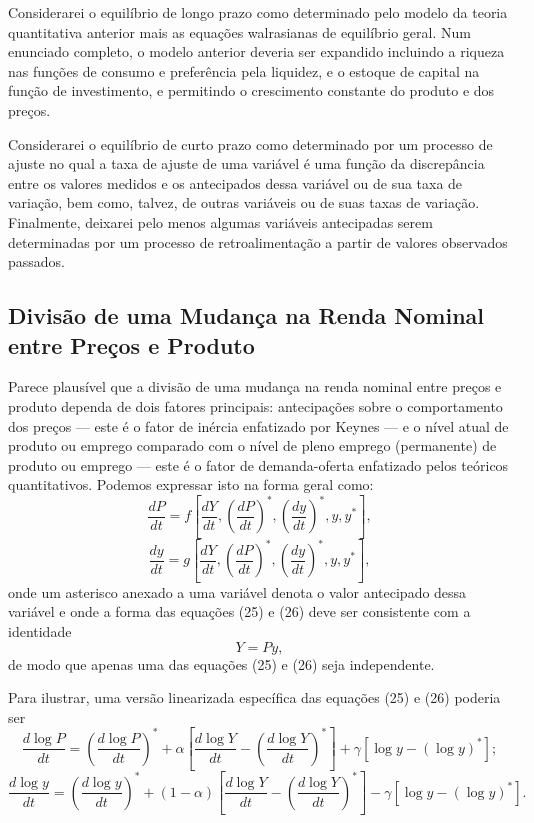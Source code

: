 \documentclass[12pt]{article}
\begin{document}
Considerarei o equilíbrio de longo prazo como determinado pelo modelo da teoria quantitativa anterior mais as equações walrasianas de equilíbrio geral. Num enunciado completo, o modelo anterior deveria ser expandido incluindo a riqueza nas funções de consumo e preferência pela liquidez, e o estoque de capital na função de investimento, e permitindo o crescimento constante do produto e dos preços.

Considerarei o equilíbrio de curto prazo como determinado por um processo de ajuste no qual a taxa de ajuste de uma variável é uma função da discrepância entre os valores medidos e os antecipados dessa variável ou de sua taxa de variação, bem como, talvez, de outras variáveis ou de suas taxas de variação. Finalmente, deixarei pelo menos algumas variáveis antecipadas serem determinadas por um processo de retroalimentação a partir de valores observados passados.

\subsection{Divisão de uma Mudança na Renda Nominal entre Preços e Produto}

Parece plausível que a divisão de uma mudança na renda nominal entre preços e produto dependa de dois fatores principais: antecipações sobre o comportamento dos preços — este é o fator de inércia enfatizado por Keynes — e o nível atual de produto ou emprego comparado com o nível de pleno emprego (permanente) de produto ou emprego — este é o fator de demanda-oferta enfatizado pelos teóricos quantitativos. Podemos expressar isto na forma geral como:
\begin{equation}
\frac{dP}{dt} = f\left[ \frac{dY}{dt}, \left(\frac{dP}{dt}\right)^*, \left(\frac{dy}{dt}\right)^*, y, y^* \right],
\end{equation}
\begin{equation}
\frac{dy}{dt} = g\left[ \frac{dY}{dt}, \left(\frac{dP}{dt}\right)^*, \left(\frac{dy}{dt}\right)^*, y, y^* \right],
\end{equation}
onde um asterisco anexado a uma variável denota o valor antecipado dessa variável e onde a forma das equações (25) e (26) deve ser consistente com a identidade
\begin{equation}
Y = Py,
\end{equation}
de modo que apenas uma das equações (25) e (26) seja independente.

Para ilustrar, uma versão linearizada específica das equações (25) e (26) poderia ser
\begin{equation}
\frac{d \log P}{dt} = \left( \frac{d \log P}{dt} \right)^* + \alpha \left[ \frac{d \log Y}{dt} - \left( \frac{d \log Y}{dt} \right)^* \right] + \gamma [\log y - (\log y)^*];
\end{equation}
\begin{equation}
\frac{d \log y}{dt} = \left( \frac{d \log y}{dt} \right)^* + (1 - \alpha) \left[ \frac{d \log Y}{dt} - \left( \frac{d \log Y}{dt} \right)^* \right] - \gamma [\log y - (\log y)^*].
\end{equation}
\end{document}
